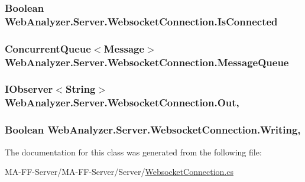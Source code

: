 \subsubsection[{Is\+Connected}]{\setlength{\rightskip}{0pt plus 5cm}Boolean Web\+Analyzer.\+Server.\+Websocket\+Connection.\+Is\+Connected\hspace{0.3cm}{\ttfamily [get]}}\label{class_web_analyzer_1_1_server_1_1_websocket_connection_a54d71b7e50589c027fff5441dea6ca54}
\hypertarget{class_web_analyzer_1_1_server_1_1_websocket_connection_a38b19724259bebddd5990d394a3df6fd}{}
\subsubsection[{Message\+Queue}]{\setlength{\rightskip}{0pt plus 5cm}Concurrent\+Queue$<${\bf Message}$>$ Web\+Analyzer.\+Server.\+Websocket\+Connection.\+Message\+Queue\hspace{0.3cm}{\ttfamily [get]}}\label{class_web_analyzer_1_1_server_1_1_websocket_connection_a38b19724259bebddd5990d394a3df6fd}
\hypertarget{class_web_analyzer_1_1_server_1_1_websocket_connection_a1f0be7b1ff80c5b742204d0883157578}{}
\subsubsection[{Out}]{\setlength{\rightskip}{0pt plus 5cm}I\+Observer$<$String$>$ Web\+Analyzer.\+Server.\+Websocket\+Connection.\+Out\hspace{0.3cm}{\ttfamily [get]}, {\ttfamily [set]}}\label{class_web_analyzer_1_1_server_1_1_websocket_connection_a1f0be7b1ff80c5b742204d0883157578}
\hypertarget{class_web_analyzer_1_1_server_1_1_websocket_connection_a973edb4f0e5e1644f551bf132ae77183}{}
\subsubsection[{Writing}]{\setlength{\rightskip}{0pt plus 5cm}Boolean Web\+Analyzer.\+Server.\+Websocket\+Connection.\+Writing\hspace{0.3cm}{\ttfamily [get]}, {\ttfamily [set]}}\label{class_web_analyzer_1_1_server_1_1_websocket_connection_a973edb4f0e5e1644f551bf132ae77183}


The documentation for this class was generated from the following file\+:\begin{DoxyCompactItemize}
\item 
M\+A-\/\+F\+F-\/\+Server/\+M\+A-\/\+F\+F-\/\+Server/\+Server/\hyperlink{_websocket_connection_8cs}{Websocket\+Connection.\+cs}\end{DoxyCompactItemize}
